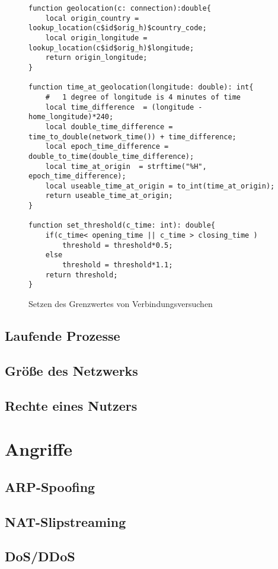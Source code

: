 \begin{figure}[h!]
\begin{lstlisting}
function geolocation(c: connection):double{
	local origin_country = lookup_location(c$id$orig_h)$country_code;
	local origin_longitude = lookup_location(c$id$orig_h)$longitude;
	return origin_longitude;
}

function time_at_geolocation(longitude: double): int{
	#	1 degree of longitude is 4 minutes of time
	local time_difference  = (longitude - home_longitude)*240;
	local double_time_difference = time_to_double(network_time()) + time_difference;
	local epoch_time_difference = double_to_time(double_time_difference);
	local time_at_origin  = strftime("%H", epoch_time_difference);
	local useable_time_at_origin = to_int(time_at_origin);
	return useable_time_at_origin;
}

function set_threshold(c_time: int): double{
	if(c_time< opening_time || c_time > closing_time )
		threshold = threshold*0.5;
	else 
		threshold = threshold*1.1;
	return threshold;
}
\end{lstlisting}
\caption{Setzen des Grenzwertes von Verbindungsversuchen}
\end{figure}
\subsection{Laufende Prozesse}
\subsection{Größe des Netzwerks}
\subsection{Rechte eines Nutzers}

\section{Angriffe}
\subsection{ARP-Spoofing}
\subsection{NAT-Slipstreaming}
\subsection{DoS/DDoS}
\subsection{}